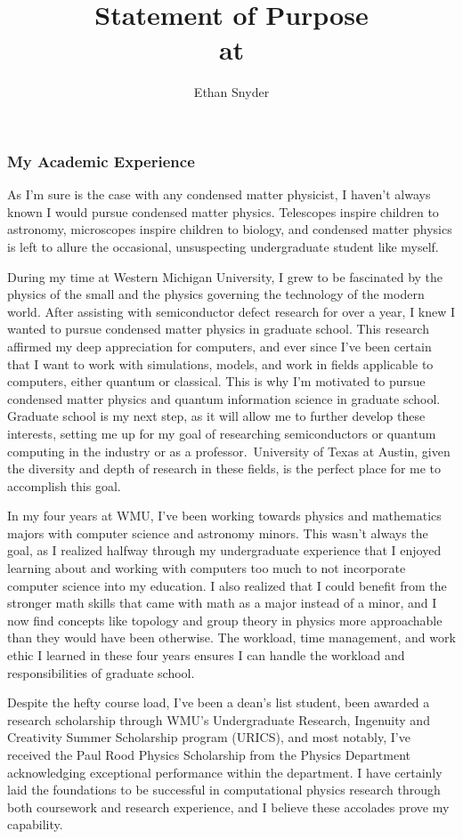 \documentclass[11pt]{article}
\title{\vspace{-5em}Statement of Purpose\\
	\large \dept{} at \school{}}
\author{Ethan Snyder}
\date{}
\newcommand{\school}{University of Texas at Austin}
\begin{document}
\maketitle
\subsubsection*{My Academic Experience}
As I'm sure is the case with any condensed matter physicist, I haven't always known I would pursue condensed matter physics. Telescopes inspire children to astronomy, microscopes inspire children to biology, and condensed matter physics is left to allure the occasional, unsuspecting undergraduate student like myself.

During my time at Western Michigan University, I grew to be fascinated by the physics of the small and the physics governing the technology of the modern world. After assisting with semiconductor defect research for over a year, I knew I wanted to pursue condensed matter physics in graduate school. This research affirmed my deep appreciation for computers, and ever since I've been certain that I want to work with simulations, models, and work in fields applicable to computers, either quantum or classical. This is why I'm motivated to pursue condensed matter physics and quantum information science in graduate school. Graduate school is my next step, as it will allow me to further develop these interests, setting me up for my goal of researching semiconductors or quantum computing in the industry or as a professor.\ \school{}, given the diversity and depth of research in these fields, is the perfect place for me to accomplish this goal.

In my four years at WMU, I've been working towards physics and mathematics majors with computer science and astronomy minors. This wasn't always the goal, as I realized halfway through my undergraduate experience that I enjoyed learning about and working with computers too much to not incorporate computer science into my education. I also realized that I could benefit from the stronger math skills that came with math as a major instead of a minor, and I now find concepts like topology and group theory in physics more approachable than they would have been otherwise. The workload, time management, and work ethic I learned in these four years ensures I can handle the workload and responsibilities of graduate school.

Despite the hefty course load, I've been a dean's list student, been awarded a research scholarship through WMU's Undergraduate Research, Ingenuity and Creativity Summer Scholarship program (URICS), and most notably, I've received the Paul Rood Physics Scholarship from the Physics Department acknowledging exceptional performance within the department. I have certainly laid the foundations to be successful in computational physics research through both coursework and research experience, and I believe these accolades prove my capability.
\end{document}
